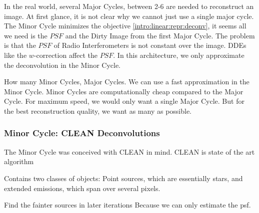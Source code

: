 In the real world, several Major Cycles, between 2-6 are needed to reconstruct an image.
At first glance, it is not clear why we cannot just use a single major cycle. The Minor Cycle minimizes the objective \eqref{intro:linear:repr:deconv}, it seems all we need is the $PSF$ and the Dirty Image from the first Major Cycle. The problem is that the $PSF$ of Radio Interferometers is not constant over the image. DDEs like the $w$-correction affect the $PSF$. In this architecture, we only approximate the deconvolution in the Minor Cycle. 

How many Minor Cycles, Major Cycles. We can use a fast approximation in the Minor Cycle. Minor Cycles are computationally cheap compared to the Major Cycle. For maximum speed, we would only want a single Major Cycle. But for the best reconstruction quality, we want as many as possible.

\subsubsection{Minor Cycle: CLEAN Deconvolutions}

The Minor Cycle was conceived with CLEAN in mind.
CLEAN is state of the art algorithm

Contains two classes of objects: Point sources, which are essentially stars, and extended emissions, which span over several pixels.


Find the fainter sources in later iterations
Because we can only estimate the psf.






